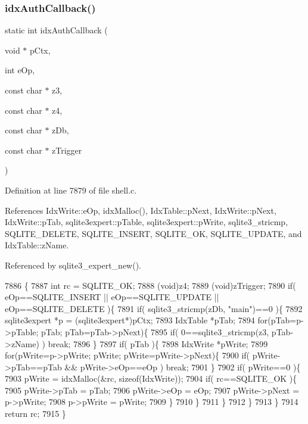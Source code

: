 \subsubsection{idx\+Auth\+Callback()}
{\footnotesize\ttfamily static int idx\+Auth\+Callback (\begin{DoxyParamCaption}\item[{void $\ast$}]{p\+Ctx,  }\item[{int}]{e\+Op,  }\item[{const char $\ast$}]{z3,  }\item[{const char $\ast$}]{z4,  }\item[{const char $\ast$}]{z\+Db,  }\item[{const char $\ast$}]{z\+Trigger }\end{DoxyParamCaption})\hspace{0.3cm}{\ttfamily [static]}}



Definition at line 7879 of file shell.\+c.



References Idx\+Write\+::e\+Op, idx\+Malloc(), Idx\+Table\+::p\+Next, Idx\+Write\+::p\+Next, Idx\+Write\+::p\+Tab, sqlite3expert\+::p\+Table, sqlite3expert\+::p\+Write, sqlite3\+\_\+stricmp, S\+Q\+L\+I\+T\+E\+\_\+\+D\+E\+L\+E\+TE, S\+Q\+L\+I\+T\+E\+\_\+\+I\+N\+S\+E\+RT, S\+Q\+L\+I\+T\+E\+\_\+\+OK, S\+Q\+L\+I\+T\+E\+\_\+\+U\+P\+D\+A\+TE, and Idx\+Table\+::z\+Name.



Referenced by sqlite3\+\_\+expert\+\_\+new().


\begin{DoxyCode}
7886  \{
7887   \textcolor{keywordtype}{int} rc = SQLITE_OK;
7888   (void)z4;
7889   (void)zTrigger;
7890   \textcolor{keywordflow}{if}( eOp==SQLITE_INSERT || eOp==SQLITE_UPDATE || eOp==SQLITE_DELETE )\{
7891     \textcolor{keywordflow}{if}( sqlite3_stricmp(zDb, \textcolor{stringliteral}{"main"})==0 )\{
7892       sqlite3expert *p = (sqlite3expert*)pCtx;
7893       IdxTable *pTab;
7894       \textcolor{keywordflow}{for}(pTab=p->pTable; pTab; pTab=pTab->pNext)\{
7895         \textcolor{keywordflow}{if}( 0==sqlite3_stricmp(z3, pTab->zName) ) \textcolor{keywordflow}{break};
7896       \}
7897       \textcolor{keywordflow}{if}( pTab )\{
7898         IdxWrite *pWrite;
7899         \textcolor{keywordflow}{for}(pWrite=p->pWrite; pWrite; pWrite=pWrite->pNext)\{
7900           \textcolor{keywordflow}{if}( pWrite->pTab==pTab && pWrite->eOp==eOp ) \textcolor{keywordflow}{break};
7901         \}
7902         \textcolor{keywordflow}{if}( pWrite==0 )\{
7903           pWrite = idxMalloc(&rc, \textcolor{keyword}{sizeof}(IdxWrite));
7904           \textcolor{keywordflow}{if}( rc==SQLITE_OK )\{
7905             pWrite->pTab = pTab;
7906             pWrite->eOp = eOp;
7907             pWrite->pNext = p->pWrite;
7908             p->pWrite = pWrite;
7909           \}
7910         \}
7911       \}
7912     \}
7913   \}
7914   \textcolor{keywordflow}{return} rc;
7915 \}
\end{DoxyCode}
\mbox{\label{shell_8c_ab58f7088fa5adfe00c9ca9a1444f09cf}} 
